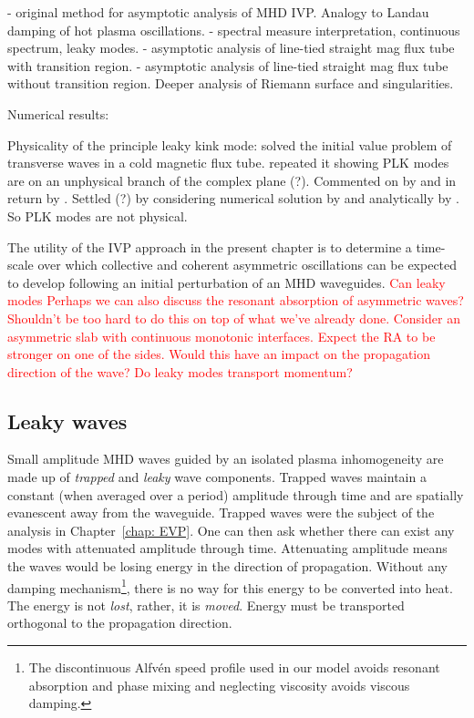 \documentclass[12pt, draft]{../style-files/ociamthesis}
\begin{document}
\cite{sed71} - original method for asymptotic analysis of MHD IVP. Analogy to Landau damping of hot plasma oscillations.
\cite{and_etal07} - spectral measure interpretation, continuous spectrum, leaky modes.
\cite{rud_etal02} - asymptotic analysis of line-tied straight mag flux tube with transition region.
\cite{rud_etal06} - asymptotic analysis of line-tied straight mag flux tube without transition region. Deeper analysis of Riemann surface and singularities.


Numerical results: \cite{ter_etal06}

Physicality of the principle leaky kink mode: \cite{cal03} solved the initial value problem of transverse waves in a cold magnetic flux tube. \cite{rud_etal06} repeated it showing PLK modes are on an unphysical branch of the complex plane (?). Commented on by \cite{cal06} and in return by \cite{rud_etal06b}. Settled (?) by considering numerical solution by \cite{ter_etal07} and analytically by \cite{and_etal07}. So PLK modes are not physical.

\color{black}

The utility of the IVP approach in the present chapter is to determine a time-scale over which collective and coherent asymmetric oscillations can be expected to develop following an initial perturbation of an MHD waveguides. \textcolor{red}{Can leaky modes Perhaps we can also discuss the resonant absorption of asymmetric waves? Shouldn't be too hard to do this on top of what we've already done. Consider an asymmetric slab with continuous monotonic interfaces. Expect the RA to be stronger on one of the sides. Would this have an impact on the propagation direction of the wave? Do leaky modes transport momentum?}

\color{red}
\subsection{Leaky waves}

Small amplitude MHD waves guided by an isolated plasma inhomogeneity are made up of \textit{trapped} and \textit{leaky} wave components. Trapped waves maintain a constant (when averaged over a period) amplitude through time and are spatially evanescent away from the waveguide. Trapped waves were the subject of the analysis in Chapter~\ref{chap: EVP}. One can then ask whether there can exist any modes with attenuated amplitude through time. Attenuating amplitude means the waves would be losing energy in the direction of propagation. Without any damping mechanism\footnote{The discontinuous Alfv\'{e}n speed profile used in our model avoids resonant absorption and phase mixing and neglecting viscosity avoids viscous damping.}, there is no way for this energy to be converted into heat. The energy is not \textit{lost}, rather, it is \textit{moved}. Energy must be transported orthogonal to the propagation direction.
\end{document}
